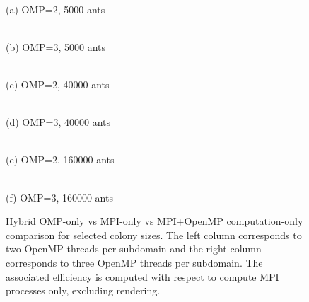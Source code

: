 \begin{figure}[!t]
\centering
\begin{minipage}{0.48\columnwidth}
    \centering
    \\[-2mm]
    {\footnotesize (a) OMP=2, 5000 ants}
\end{minipage}
\hfill
\begin{minipage}{0.48\columnwidth}
    \centering
    \\[-2mm]
    {\footnotesize (b) OMP=3, 5000 ants}
\end{minipage}

\vspace{1mm}
\begin{minipage}{0.48\columnwidth}
    \centering
    \\[-2mm]
    {\footnotesize (c) OMP=2, 40000 ants}
\end{minipage}
\hfill
\begin{minipage}{0.48\columnwidth}
    \centering
    \\[-2mm]
    {\footnotesize (d) OMP=3, 40000 ants}
\end{minipage}

\vspace{1mm}
\begin{minipage}{0.48\columnwidth}
    \centering
    \\[-2mm]
    {\footnotesize (e) OMP=2, 160000 ants}
\end{minipage}
\hfill
\begin{minipage}{0.48\columnwidth}
    \centering
    \\[-2mm]
    {\footnotesize (f) OMP=3, 160000 ants}
\end{minipage}
\caption{Hybrid OMP-only vs MPI-only vs MPI+OpenMP computation-only comparison for selected colony sizes. The left column corresponds to two OpenMP threads per subdomain and the right column corresponds to three OpenMP threads per subdomain. The associated efficiency is computed with respect to compute MPI processes only, excluding rendering.}
\label{fig:hybrid_compare_calc_selected}
\end{figure}

